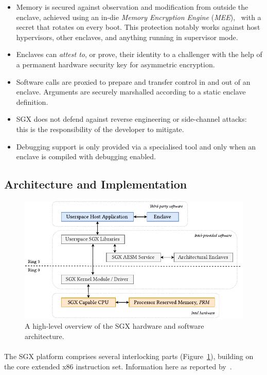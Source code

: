 \begin{itemize}
    \item Memory is secured against observation and modification from outside the enclave, achieved using an in-die \textit{Memory Encryption Engine} (\textit{MEE}),~\cite{sgx-mee} with a secret that rotates on every boot. This protection notably works against host hypervisors, other enclaves, and anything running in supervisor mode.
    \item Enclaves can \textit{attest to}, or prove, their identity to a challenger with the help of a permanent hardware security key for asymmetric encryption.
    \item Software calls are proxied to prepare and transfer control in and out of an enclave. Arguments are securely marshalled according to a static enclave definition.
    \item SGX does not defend against reverse engineering or side-channel attacks:~\cite{10.1109/SP.2015.45} this is the responsibility of the developer to mitigate.
    \item Debugging support is only provided via a specialised tool and only when an enclave is compiled with debugging enabled.
\end{itemize}

\subsection{Architecture and Implementation}

\begin{figure}[]
    \centering
    \includegraphics[width=0.9\linewidth]{figures/SGX-AdvArchitecture.pdf}
    \caption{A high-level overview of the SGX hardware and software architecture.}
    \label{fig:sgx-advarch}
\end{figure}

\paragraph{} The SGX platform comprises several interlocking parts (Figure~\ref{fig:sgx-advarch}), building on the core extended x86 instruction set. Information here as reported by~\cite{sgx-sgx-reference,Costan2016IntelSE}.

